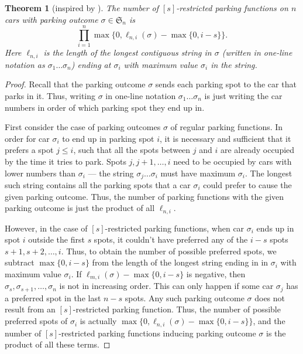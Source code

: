 \documentclass[12 pt]{amsart}
\newtheorem{theorem}{Theorem}
\theoremstyle{definition} %
\theoremstyle{remark} %
\begin{document}
\begin{theorem}[inspired by \cite{pinsky-2024}]
    The number of $[s]$-restricted parking functions on $n$ cars with parking outcome $\sigma \in \mathfrak{S}_n$ is
    \[
    \prod_{i = 1}^n \max \{ 0, \ell_{n,i}(\sigma)-\max \{ 0, i - s \} \}.
    \]
    Here $\ell_{n, i}$ is the length of the longest contiguous string in $\sigma$ (written in one-line notation as $\sigma_{1} \dots \sigma_{n}$) ending at $\sigma_i$ with maximum value $\sigma_i$ in the string.
\end{theorem}

\begin{proof}
	Recall that the parking outcome $\sigma$ sends each parking spot to the car that parks in it. Thus, writing $\sigma$ in one-line notation $\sigma_{1} \dots \sigma_{n}$ is just writing the car numbers in order of which parking spot they end up in.

	First consider the case of parking outcomes $\sigma$ of regular parking functions. In order for car $\sigma_{i}$ to end up in parking spot $i$, it is necessary and sufficient that it prefers a spot $j \le i$, such that all the spots between $j$ and $i$ are already occupied by the time it tries to park. Spots $j, j + 1, \dots, i$ need to be occupied by cars with lower numbers than $\sigma_{i}$ --- the string $\sigma_{j} \dots \sigma_{i}$ must have maximum $\sigma_{i}$. The longest such string contains all the parking spots that a car $\sigma_{i}$ could prefer to cause the given parking outcome. Thus, the number of parking functions with the given parking outcome is just the product of all $\ell_{n, i}$.

	However, in the case of $[s]$-restricted parking functions, when car $\sigma_{i}$ ends up in spot $i$ outside the first $s$ spots, it couldn't have preferred any of the $i - s$ spots $s + 1, s + 2, \dots, i$. Thus, to obtain the number of possible preferred spots, we subtract $\max \{ 0, i - s \}$ from the length of the longest string ending in in $\sigma_{i}$ with maximum value $\sigma_{i}$. If $\ell_{m, i}(\sigma) - \max \{ 0, i - s \}$ is negative, then $\sigma_{s}, \sigma_{s + 1}, \dots, \sigma_{n}$ is not in increasing order. This can only happen if some car $\sigma_{j}$ has a preferred spot in the last $n - s$ spots. Any such parking outcome $\sigma$ does not result from an $[s]$-restricted parking function. Thus, the number of possible preferred spots of $\sigma_{i}$ is actually $\max \{ 0, \ell_{n, i}(\sigma) - \max \{ 0, i - s \} \}$, and the number of $[s]$-restricted parking functions inducing parking outcome $\sigma$ is the product of all these terms.
\end{proof}
 
\end{document}
